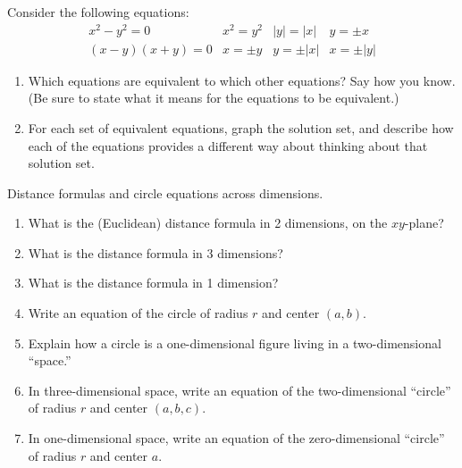 \begin{prob}
Consider the following equations:  
\setlength{\arraycolsep}{12pt}
\setlength{\extrarowheight}{3pt}
\[
\begin{array}{cccc}
x^2-y^2=0    &   x^2=y^2   &   |y|=|x|   &   y= \pm x \\
(x-y)(x+y)=0  &   x= \pm y   &   y = \pm|x|   & x = \pm|y|
\end{array}
\]
\begin{enumerate}
\item Which equations are equivalent to which other equations?  Say how you know.  (Be sure to state what it means for the equations to be equivalent.)
\item For each set of equivalent equations, graph the solution set, and describe how each of the equations provides a different way about thinking about that solution set.  
\end{enumerate}
\end{prob}

\begin{prob}
Distance formulas and circle equations across dimensions.  
\begin{enumerate}
\item What is the (Euclidean) distance formula in 2 dimensions, on the $xy$-plane?  
\item What is the distance formula in 3 dimensions?
\item What is the distance formula in 1 dimension?
\item Write an equation of the circle of radius $r$ and center $(a, b)$.  
\item Explain how a circle is a one-dimensional figure living in a two-dimensional ``space.''
\item In three-dimensional space, write an equation of the two-dimensional ``circle'' of radius $r$ and center $(a, b, c)$.  
\item In one-dimensional space, write an equation of the zero-dimensional ``circle'' of radius $r$ and center $a$.  
\end{enumerate}
\end{prob}

